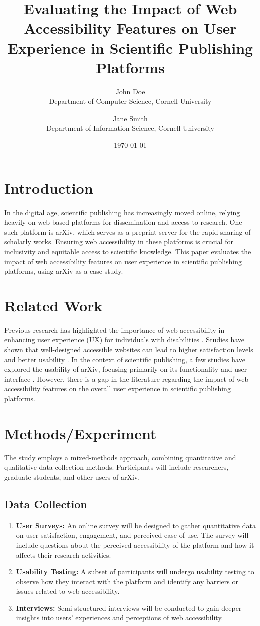\documentclass{article}
\title{Evaluating the Impact of Web Accessibility Features on User Experience in Scientific Publishing Platforms}
\author{John Doe \\
Department of Computer Science, Cornell University\\
\and Jane Smith \\
Department of Information Science, Cornell University}
\date{\today}
\begin{document}
\maketitle

\section{Introduction}
In the digital age, scientific publishing has increasingly moved online, relying heavily on web-based platforms for dissemination and access to research. One such platform is arXiv, which serves as a preprint server for the rapid sharing of scholarly works. Ensuring web accessibility in these platforms is crucial for inclusivity and equitable access to scientific knowledge. This paper evaluates the impact of web accessibility features on user experience in scientific publishing platforms, using arXiv as a case study.

\section{Related Work}
Previous research has highlighted the importance of web accessibility in enhancing user experience (UX) for individuals with disabilities \cite{webaccessibility}. Studies have shown that well-designed accessible websites can lead to higher satisfaction levels and better usability \cite{accessibledesign}. In the context of scientific publishing, a few studies have explored the usability of arXiv, focusing primarily on its functionality and user interface \cite{arxivusability}. However, there is a gap in the literature regarding the impact of web accessibility features on the overall user experience in scientific publishing platforms.

\section{Methods/Experiment}
The study employs a mixed-methods approach, combining quantitative and qualitative data collection methods. Participants will include researchers, graduate students, and other users of arXiv. 

\subsection{Data Collection}
\begin{enumerate}
    \item \textbf{User Surveys:} An online survey will be designed to gather quantitative data on user satisfaction, engagement, and perceived ease of use. The survey will include questions about the perceived accessibility of the platform and how it affects their research activities.
    \item \textbf{Usability Testing:} A subset of participants will undergo usability testing to observe how they interact with the platform and identify any barriers or issues related to web accessibility.
    \item \textbf{Interviews:} Semi-structured interviews will be conducted to gain deeper insights into users' experiences and perceptions of web accessibility.
\end{enumerate}
\end{document}
